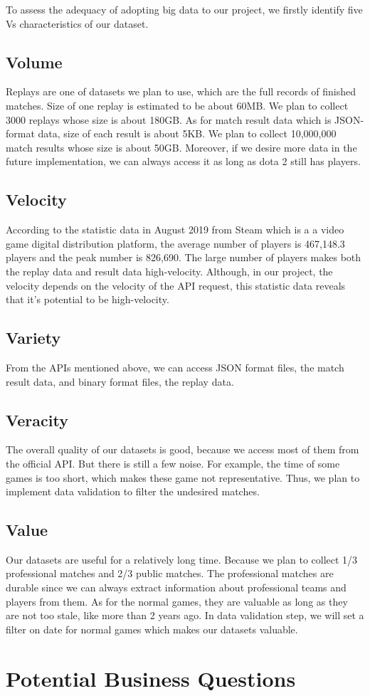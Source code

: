 \documentclass{article}
\newcommand{\bigdataVs}[1]{
	\subsection{#1}
}
\begin{document}
To assess the adequacy of adopting big data to our project, we firstly identify five Vs characteristics of our dataset.

\bigdataVs{Volume}

Replays are one of datasets we plan to use, which are the full records of finished matches. Size of one replay is estimated to be about 60MB. We plan to collect 3000 replays whose size is about 180GB. As for match result data which is JSON-format data, size of each result is about 5KB. We plan to collect 10,000,000 match results whose size is about 50GB. Moreover, if we desire more data in the future implementation, we can always access it as long as dota 2 still has players.

\bigdataVs{Velocity}

According to the statistic data in August 2019 from Steam which is a a video game digital distribution platform, the average number of players is 467,148.3 players and the peak number is 826,690.
The large number of players makes both the replay data and result data high-velocity.
Although, in our project, the velocity depends on the velocity of the API request, this statistic data reveals that it's potential to be high-velocity.

\bigdataVs{Variety}

From the APIs mentioned above, we can access JSON format files, the match result data, and binary format files, the replay data.

\bigdataVs{Veracity}

The overall quality of our datasets is good, because we access most of them from the official API.
But there is still a few noise.
For example, the time of some games is too short, which makes these game not representative.
Thus, we plan to implement data validation to filter the undesired matches.

\bigdataVs{Value}

Our datasets are useful for a relatively long time.
Because we plan to collect 1/3 professional matches and 2/3 public matches.
The professional matches are durable since we can always extract information about professional teams and players from them.
As for the normal games, they are valuable as long as they are not too stale, like more than 2 years ago.
In data validation step, we will set a filter on date for normal games which makes our datasets valuable.

\section{Potential Business Questions}
\end{document}
